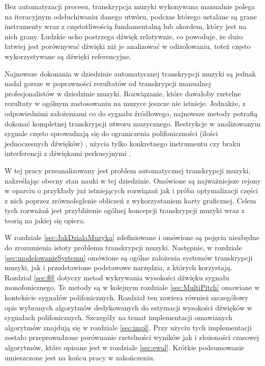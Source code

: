 \documentclass[12pt,a4paper,twoside]{mwart}
\begin{document}
Bez automatyzacji procesu, transkrypcja muzyki wykonywana manualnie polega na iteracyjnym odsłuchiwaniu danego utwóru, podczas którego ustalane są grane instrumenty wraz z częstotliwością fundamentalną lub akordem, który jest na nich grany.  Ludzkie ucho postrzega dźwięk relatywnie, co powoduje, że dużo łatwiej jest porównywać dźwięki niż je analizować w odizolowaniu, toteż często wykorzystywane są dźwięki referencyjne.

Najnowsze dokonania w dziedzinie automatycznej transkrypcji muzyki są jednak nadal gorsze w poprawności rezultatów od transkrypcji manualnej profesjonalistów w dziedzinie muzyki. Rozwiązanie, które dawałoby rzetelne rezultaty w ogólnym zastosowaniu na muzyce jeszcze nie istnieje. Jednakże, z odpowiednimi założeniami co do sygnału źródłowego, najnowsze metody potrafią dokonać kompletnej transkrypcji utworu muzycznego. Restrykcje w analizowanym sygnale często sprowadzają się do ograniczenia polifoniczności (ilości jednoczesnych dźwięków) 
\cite[1-2]{Transcription:BayesianHarmonicModels},
użycia tylko konkretnego instrumentu \cite{Transcription:Hawthorne:OnsetsAndFrames} czy braku interferencji z dźwiękami perkusyjnymi \cite{Transcription:Kameoka:HarmonicSeparation}.

W tej pracy przeanalizowany jest problem automatycznej transkrypcji muzyki, nakreślając obecny stan nauki w tej dziedzinie. Omówione są najważniejsze rejony w oparciu o przykłady już istniejących rozwiązań jak i próba optymalizacji części z nich poprzez zrównoleglenie obliczeń z wykorzystaniem karty graficznej. Celem tych rozważań jest przybliżenie ogólnej koncepcji transkrypcji muzyki wraz z teorią na jakiej się opiera.

W rozdziale \ref{sec:JakDzialaMuzyka} zdefiniowane i omówione są pojęcia niezbędne do zrozumienia istoty problemu transkrypcji muzyki. Następnie, w rozdziale \ref{sec:modelowanieSystemu} omówione są ogólne założenia systemów transkrypcji muzyki, jak i przedstawione podstawowe narzędzia, z których korzystają. Rozdział \ref{sec:f0} dotyczy metod wykrywania wysokości dźwięku sygnału monofonicznego. Te metody są w kolejnym rozdziale \ref{sec:MultiPitch} omawiane w kontekście sygnałów polifonicznych. Rozdział ten zawiera również szczegółowy opis wybranych algorytmów dedykowanych do estymacji wysokości dźwięków w sygnałach polifonicznych. Szczegóły na temat implementacji omawianych algorytmów znajdują się w rozdziale \ref{sec:impl}. Przy użyciu tych implementacji zostało przeprowadzone porównanie rzetelności wyników jak i złożoności czasowej algorytmów, które opisane jest w rozdziale \ref{sec:ewal}. Krótkie podsumowanie umieszczone jest na końcu pracy w zakończeniu. 
\end{document}
